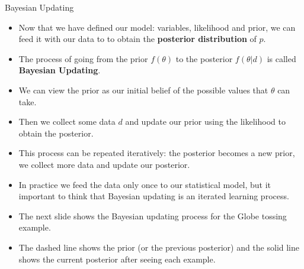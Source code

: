 \documentclass[handout]{beamer}
\begin{document}
\begin{frame}{Bayesian Updating}
\scriptsize{

\begin{itemize}
\item Now that we have defined our model: variables, likelihood and prior, we can feed it with our data to  to obtain the \textbf{posterior distribution} of $p$.
\item The process of going from the prior $f(\theta)$ to the posterior $f(\theta|d)$ is called \textbf{Bayesian Updating}.
\item We can view the prior as our initial belief of the possible values that $\theta$ can take.
\item Then we collect some data $d$ and update our prior using the likelihood to obtain the posterior.
\item This process can be repeated iteratively: the posterior becomes a new prior, we collect more data and update our posterior.
\item In practice we feed the data only once to our statistical model, but it important to think that Bayesian updating is an iterated learning process.
\item The next slide shows the Bayesian updating process for the Globe tossing example.
\item The dashed line shows the prior (or the previous posterior) and the solid line shows the current posterior after seeing each example.
\end{itemize}

} 

\end{frame}
\end{document}
